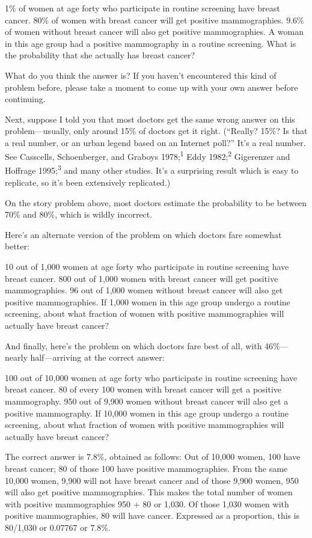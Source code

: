 {
 1\% of women at age forty who participate in routine screening
have breast cancer. 80\% of women with breast cancer will get positive
mammographies. 9.6\% of women without breast cancer will also get
positive mammographies. A woman in this age group had a positive
mammography in a routine screening. What is the probability that she
actually has breast cancer?}

{
 What do you think the answer is? If you haven't
encountered this kind of problem before, please take a moment to come
up with your own answer before continuing.}

{
 Next, suppose I told you that most doctors get the same wrong
answer on this problem---usually, only around 15\% of doctors get it
right. (``Really? 15\%? Is that a real number, or an
urban legend based on an Internet poll?''
It's a real number. See Casscells, Schoenberger, and
Graboys 1978;\textsuperscript{1} Eddy 1982;\textsuperscript{2}
Gigerenzer and Hoffrage 1995;\textsuperscript{3} and many other
studies. It's a surprising result which is easy to
replicate, so it's been extensively replicated.)}

{
 On the story problem above, most doctors estimate the probability
to be between 70\% and 80\%, which is wildly incorrect.}

{
 Here's an alternate version of the problem on
which doctors fare somewhat better:}

{
 10 out of 1,000 women at age forty who participate in routine
screening have breast cancer. 800 out of 1,000 women with breast cancer
will get positive mammographies. 96 out of 1,000 women without breast
cancer will also get positive mammographies. If 1,000 women in this age
group undergo a routine screening, about what fraction of women with
positive mammographies will actually have breast cancer?}

{
 And finally, here's the problem on which doctors
fare best of all, with 46\%---nearly half---arriving at the correct
answer:}

{
 100 out of 10,000 women at age forty who participate in routine
screening have breast cancer. 80 of every 100 women with breast cancer
will get a positive mammography. 950 out of 9,900 women without breast
cancer will also get a positive mammography. If 10,000 women in this
age group undergo a routine screening, about what fraction of women
with positive mammographies will actually have breast cancer?}

{
 The correct answer is 7.8\%, obtained as follows: Out of 10,000
women, 100 have breast cancer; 80 of those 100 have positive
mammographies. From the same 10,000 women, 9,900 will not have breast
cancer and of those 9,900 women, 950 will also get positive
mammographies. This makes the total number of women with positive
mammographies 950 + 80 or 1,030. Of those 1,030 women with positive
mammographies, 80 will have cancer. Expressed as a proportion, this is
80/1,030 or 0.07767 or 7.8\%.}

